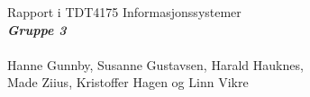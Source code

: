 

\noindent\HRule
\begin{center}
\huge
\noindent Rapport i TDT4175 Informasjonssystemer \\ [7mm]
\large
\noindent\emph{\textbf{Gruppe 3}}\\
\paragraph*{}
Hanne Gunnby, Susanne Gustavsen, Harald Hauknes,\\ 
Made Ziius, Kristoffer Hagen og Linn Vikre \\
\end{center}
\noindent\HRule
{}
